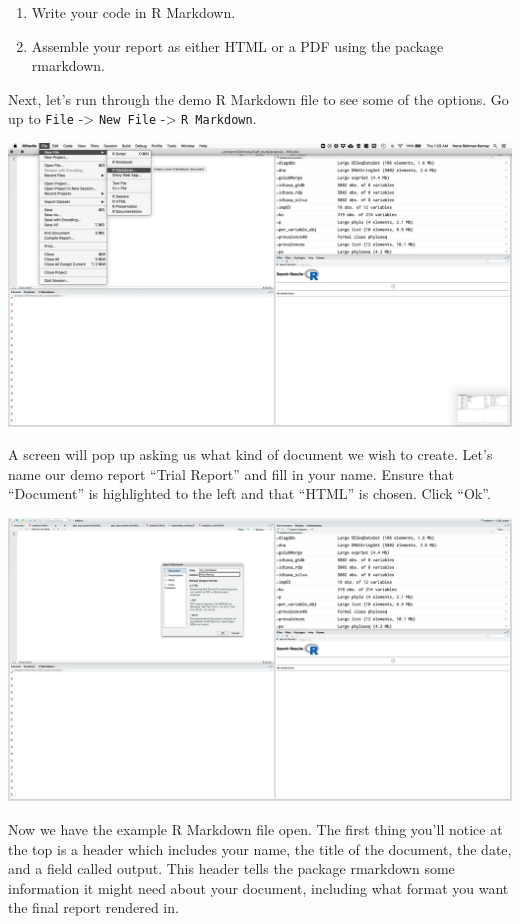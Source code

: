 \documentclass[
]{book}
\providecommand{\tightlist}{%
  \setlength{\itemsep}{0pt}\setlength{\parskip}{0pt}}
\begin{document}
\begin{enumerate}
\def\labelenumi{\arabic{enumi}.}
\tightlist
\item
  Write your code in R Markdown.
\item
  Assemble your report as either HTML or a PDF using the package rmarkdown.
\end{enumerate}

Next, let's run through the demo R Markdown file to see some of the options. Go up to \texttt{File} -\textgreater{} \texttt{New\ File} -\textgreater{} \texttt{R\ Markdown}.

\includegraphics{img/markdown.png}

A screen will pop up asking us what kind of document we wish to create. Let's name our demo report ``Trial Report'' and fill in your name. Ensure that ``Document'' is highlighted to the left and that ``HTML'' is chosen. Click ``Ok''.

\includegraphics{img/mdname.png}

Now we have the example R Markdown file open. The first thing you'll notice at the top is a header which includes your name, the title of the document, the date, and a field called output. This header tells the package rmarkdown some information it might need about your document, including what format you want the final report rendered in.
\end{document}
